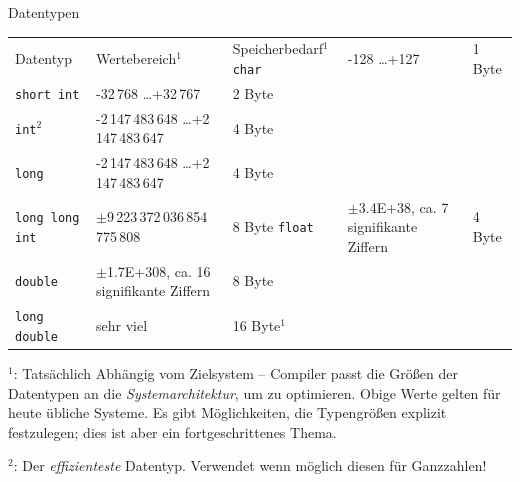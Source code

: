 \begin{frame}{Datentypen}
%
\begin{table}
	\small
	\begin{tabularx}
		{\linewidth}
		{SBS}
		
		Datentyp             & Wertebereich${}^1$ & Speicherbedarf${}^1$ \tabcrlf
		\texttt{char}        &               -128 \ldots              +127 & 1 Byte\\
		\texttt{short int}   &           -32\,768 \ldots          +32\,767 & 2 Byte\\
		\texttt{int}${}^2$   &  -2\,147\,483\,648 \ldots +2\,147\,483\,647 & 4 Byte\\
		\texttt{long}        &  -2\,147\,483\,648 \ldots +2\,147\,483\,647 & 4 Byte\\
		\texttt{long long int}  & $\pm$9\,223\,372\,036\,854\,775\,808        & 8 Byte\tabcrlf
		\texttt{float}       & $\pm$3.4E+38, ca. 7 signifikante Ziffern    & 4 Byte\\	
		\texttt{double}      & $\pm$1.7E+308, ca. 16 signifikante Ziffern  & 8 Byte\\
		\texttt{long double} & sehr viel                                   & 16 Byte${}^1$
	\end{tabularx}
\end{table}
\tiny ${}^1$: Tatsächlich Abhängig vom Zielsystem -- Compiler passt die Größen der Datentypen an die \emph{Systemarchitektur}, um zu optimieren. Obige Werte gelten für heute übliche Systeme. Es gibt Möglichkeiten, die Typengrößen explizit festzulegen; dies ist aber ein fortgeschrittenes Thema.

\tiny ${}^2$: Der \emph{effizienteste} Datentyp. Verwendet wenn möglich diesen für Ganzzahlen!
%
\end{frame}


